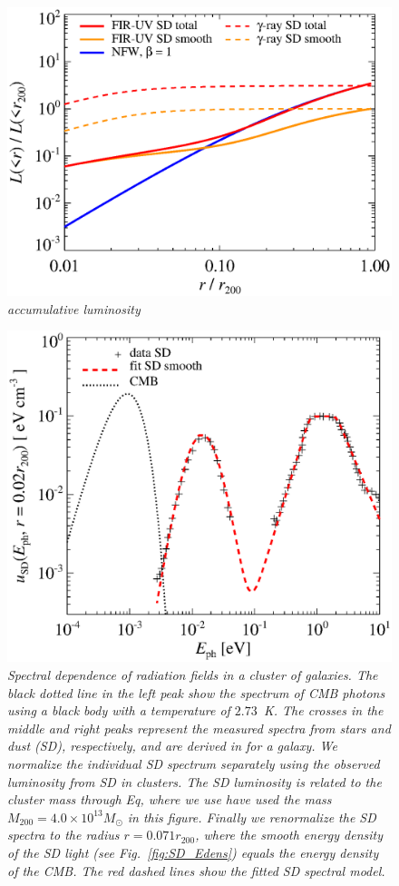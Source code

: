 \documentclass[10pt,aps,pra,reprint,amsmath,amsfonts,amssymb,showpacs]{revtex4-1}
\newcommand{\msun}{M_\odot}
\newcommand{\rvir}{r_{200}}
\newcommand{\mvir}{M_{200}}
\begin{document}
\begin{figure}%
 \includegraphics[width=0.99\columnwidth]{figures/lum.stars.eps}
\caption{\it accumulative luminosity}
 \label{fig:SD_lum}
\end{figure}
\begin{figure}%
 \includegraphics[width=0.99\columnwidth]{figures/fit.porter.v2.eps}
\caption{\it Spectral dependence of radiation fields in a cluster of
  galaxies. The black dotted line in the left peak show the spectrum
  of CMB photons using a black body with a temperature of
  $2.73$~K. The crosses in the middle and right peaks represent the
  measured spectra from stars and dust (SD), respectively, and are
  derived in \cite{2006ApJ...648L..29P} for a galaxy. We normalize the
  individual SD spectrum separately using the observed luminosity from
  SD in clusters. The SD luminosity is related to the cluster mass
  through Eq, where we use have used the mass
  $\mvir=4.0\times10^{13}\msun$ in this figure. Finally we renormalize
  the SD spectra to the radius $r=0.071\rvir$, where the smooth energy
  density of the SD light (see Fig.~\ref{fig:SD_Edens}) equals the
  energy density of the CMB. The red dashed lines show the fitted SD
  spectral model.}
 \label{fig:SD_spectra}
\end{figure}
\end{document}
